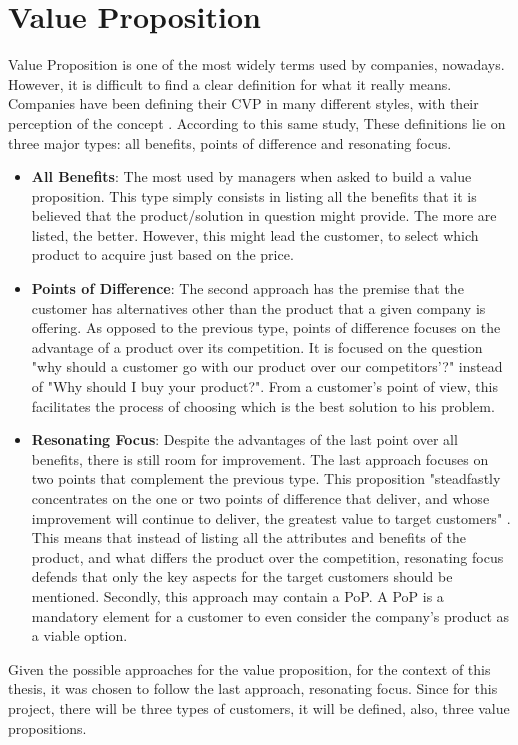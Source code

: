 \section{Value Proposition}
\label{sec:ValueProposition}
Value Proposition is one of the most widely terms used by companies, nowadays. However, it is difficult to find a clear definition for what it really means. Companies have been defining their \gls{CVP} in many different styles, with their perception of the concept \parencite{valuePropositionBusinessMarkets}. According to this same study, These definitions lie on three major types: all benefits, points of difference and resonating focus.
\begin{itemize}
    \item \textbf{All Benefits}: The most used by managers when asked to build a value proposition. This type simply consists in listing all the benefits that it is believed that the product/solution in question might provide. The more are listed, the better. However, this might lead the customer, to select which product to acquire just based on the price.
    \item \textbf{Points of Difference}: The second approach has the premise that the customer has alternatives other than the product that a given company is offering. As opposed to the previous type, points of difference focuses on the advantage of a product over its competition. It is focused on the question "why should a customer go with our product over our competitors'?" instead of "Why should I buy your product?". From a customer's point of view, this facilitates the process of choosing which is the best solution to his problem.
    \item \textbf{Resonating Focus}: Despite the advantages of the last point over all benefits, there is still room for improvement. The last approach focuses on two points that complement the previous type. This proposition "steadfastly concentrates on the one or two points of difference that deliver, and whose improvement will continue to deliver, the greatest value to target customers" \parencite{valuePropositionBusinessMarkets}. This means that instead of listing all the attributes and benefits of the product, and what differs the product over the competition, resonating focus defends that only the key aspects for the target customers should be mentioned. Secondly, this approach may contain a \gls{PoP}. A \gls{PoP} is a mandatory element for a customer to even consider the company's product as a viable option.
\end{itemize}
\par
Given the possible approaches for the value proposition, for the context of this thesis, it was chosen to follow the last approach, resonating focus. Since for this project, there will be three types of customers, it will be defined, also, three value propositions.


